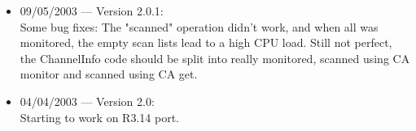 \begin{itemize}
\item 09/05/2003 --- Version 2.0.1:\\
Some bug fixes:
The  "scanned"  operation didn't work, and when all was monitored,
the  empty  scan lists lead to a high CPU load. Still not perfect,
the  ChannelInfo  code  should  be  split  into  really monitored,
scanned using CA monitor and scanned using CA get.

\item 04/04/2003 --- Version 2.0:\\
Starting to work on R3.14 port.
\end{itemize}
